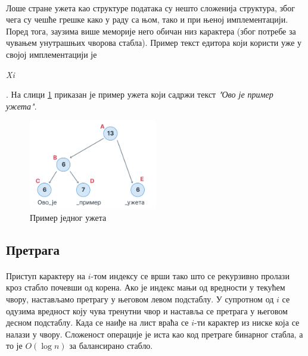 \documentclass[12pt,oneside]{memoir}
\begin{document}
\paragraph{}
Лоше стране ужета као структуре података су нешто сложенија структура, због чега су чешће грешке како у раду са њом, тако и при њеној имплементацији. Поред тога, заузима више меморије него обичан низ
карактера (због потребе за чувањем унутрашњих чворова стабла). Пример текст едитора који
користи уже у својој имплементацији је \begin{latinica}\textit{Xi}\end{latinica} \cite{Xi}.
На слици \ref{fig:rope_example} приказан је пример ужета који садржи текст 
\textit{"Ово је пример ужета"}.

\begin{figure}[!ht]
	\centering
	\includegraphics[width=0.5\textwidth]{images/rope_example.png}
	\caption{Пример једног ужета}
	\label{fig:rope_example}
\end{figure}

\subsection{Претрага}
\paragraph{}
Приступ карактеру на \(i\)-том  индексу се врши тако што се рекурзивно пролази кроз стабло 
почевши од корена. Ако је индекс мањи од вредности у текућем чвору, настављамо претрагу у његовом левом подстаблу. У супротном од \(i\) се одузима вредност коју чува тренутни 
чвор и наставља се претрага у његовом десном подстаблу. Када се наиђе на лист враћа се
\(i\)-ти карактер из ниске која се налази у чвору. Сложеност операције је иста као код
претраге бинарног стабла, а то је \(O(\log{}n)\) за балансирано стабло. 
\end{document}
